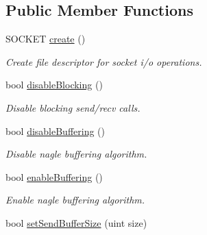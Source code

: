 \subsection*{Public Member Functions}
\begin{DoxyCompactItemize}
\item 
SOCKET \hyperlink{classSocketOperations_a542d416133a25018961be5703cc82d8f}{create} ()
\begin{DoxyCompactList}\small\item\em Create file descriptor for socket i/o operations. \item\end{DoxyCompactList}\item 
\hypertarget{classSocketOperations_a342adc61aee2904e6b6b2b650ee30c64}{
bool \hyperlink{classSocketOperations_a342adc61aee2904e6b6b2b650ee30c64}{disableBlocking} ()}
\label{classSocketOperations_a342adc61aee2904e6b6b2b650ee30c64}

\begin{DoxyCompactList}\small\item\em Disable blocking send/recv calls. \item\end{DoxyCompactList}\item 
\hypertarget{classSocketOperations_afa7bbc20f36191bb502975072f1c1bcf}{
bool \hyperlink{classSocketOperations_afa7bbc20f36191bb502975072f1c1bcf}{disableBuffering} ()}
\label{classSocketOperations_afa7bbc20f36191bb502975072f1c1bcf}

\begin{DoxyCompactList}\small\item\em Disable nagle buffering algorithm. \item\end{DoxyCompactList}\item 
\hypertarget{classSocketOperations_a136fe3ab807a04ae165f90f034d27628}{
bool \hyperlink{classSocketOperations_a136fe3ab807a04ae165f90f034d27628}{enableBuffering} ()}
\label{classSocketOperations_a136fe3ab807a04ae165f90f034d27628}

\begin{DoxyCompactList}\small\item\em Enable nagle buffering algorithm. \item\end{DoxyCompactList}\item 
\hypertarget{classSocketOperations_ac45f369202e3d1a2e245a5b9909632da}{
bool \hyperlink{classSocketOperations_ac45f369202e3d1a2e245a5b9909632da}{setSendBufferSize} (uint size)}
\label{classSocketOperations_ac45f369202e3d1a2e245a5b9909632da}


\end{DoxyCompactItemize}
